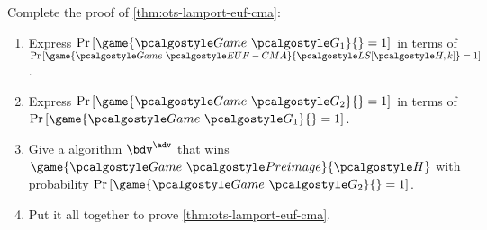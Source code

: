 \begin{exercise}
  \label{ex:ots-lamport-euf-cma}
  Complete the proof of \autoref{thm:ots-lamport-euf-cma}:
  \begin{enumerate}
      \item Express $\pr{\game{\Game~\algo{G_1}}{} = 1}$ in terms of $\pr{\game{\Game~\algo{EUF-CMA}}{\algo{LS[\algo{H}, k]}} = 1}$.
      \item Express $\pr{\game{\Game~\algo{G_2}}{} = 1}$ in terms of $\pr{\game{\Game~\algo{G_1}}{} = 1}$.
      \item Give a \ppt algorithm $\bdv^\adv$ that wins $\game{\Game~\algo{Preimage}}{\algo{H}}$ with probability $\pr{\game{\Game~\algo{G_2}}{} = 1}$.
      \item Put it all together to prove \autoref{thm:ots-lamport-euf-cma}.
  \end{enumerate}
\end{exercise}

